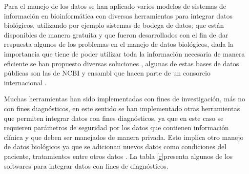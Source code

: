 {Para el manejo de los datos se han aplicado varios modelos de sistemas de información en  bioinformática con diversas herramientas para integrar datos biológicos, utilizando por ejemplo sistemas de bodega de datos; que están disponibles de manera gratuita y que fueron desarrollados con el fin de dar respuesta algunos de los problemas en el manejo de datos biológicos, dada la importancia que tiene de poder utilizar toda la información necesaria de manera eficiente se han propuesto diversas soluciones \cite{Triplet2014}, algunas de estas bases de datos públicas son las de NCBI y ensambl  que hacen parte de un consorcio internacional \cite{Sherry2001,Yates2016}.

Muchas  herramientas han sido implementadas con fines de investigación, más no con fines diagnósticos,  en este sentido se han implementado otras herramientas que permiten integrar datos con fines diagnósticos, ya que en este caso se requieren parámetros de seguridad por los datos que contienen información clínica y que deben ser manejados de manera privada. Esto implica otro manejo de datos biológicos ya que se adicionan nuevos datos como condiciones del paciente, tratamientos entre otros datos \cite{Canuel2015}. La tabla \ref{r}presenta algunos de los softwares para integrar datos con fines de diagnósticos.\\

}
